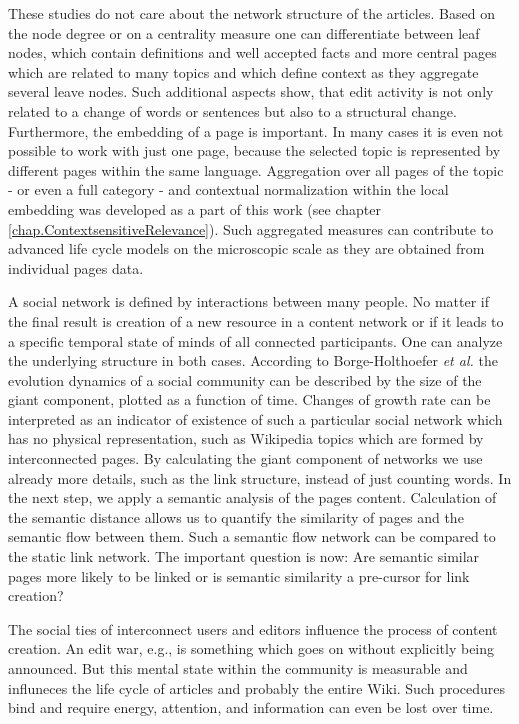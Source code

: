 \documentclass[a4paper,10pt]{scrbook}
\begin{document}
These studies do not care about the network structure of the articles. Based on the node degree or on a centrality measure one can differentiate between leaf nodes, which contain definitions and well accepted facts and more central pages which are related to many topics and which define context as they aggregate several leave nodes. Such additional aspects show, that edit activity is not only related to a change of words or sentences but also to a structural change. Furthermore, the embedding of a page is important. In many cases it is even not possible to work with just one page, because the selected topic is represented by different pages within the same language. Aggregation over all pages of the topic - or even a full category - and contextual normalization within the local embedding was developed as a part of this work (see chapter \ref{chap.ContextsensitiveRelevance}). Such aggregated measures can contribute to advanced life cycle models on the microscopic scale as they are obtained from individual pages data. 

A social network is defined by interactions between many people. No matter if the final result is creation of a new resource in a content network or if it leads to a specific temporal state of minds of all connected participants. One can analyze the underlying structure in both cases. According to Borge-Holthoefer \textit{et al.} \cite{BorgeHolthoefer2011} the evolution dynamics of a social community can be described by the size of the giant component, plotted as a function of time. Changes of growth rate can be interpreted as an indicator of existence of such a particular social network which has no physical representation, such as Wikipedia topics which are formed by interconnected pages. By calculating the giant component of networks we use already more details, such as the link structure, instead of just counting words. In the next step, we apply a semantic analysis of the pages content. Calculation of the semantic distance allows us to quantify the similarity of pages and the semantic flow between them. Such a semantic flow network can be compared to the static link network. The important question is now: Are semantic similar pages more likely to be linked or is semantic similarity a pre-cursor for link creation?  
 
The social ties of interconnect users and editors influence the process of content creation. An edit war, e.g.,  is something which goes on without explicitly being announced. But this mental state within the community is measurable and influneces the life cycle of articles and probably the entire Wiki. Such procedures bind and require energy, attention, and information can even be lost over time.
\end{document}
